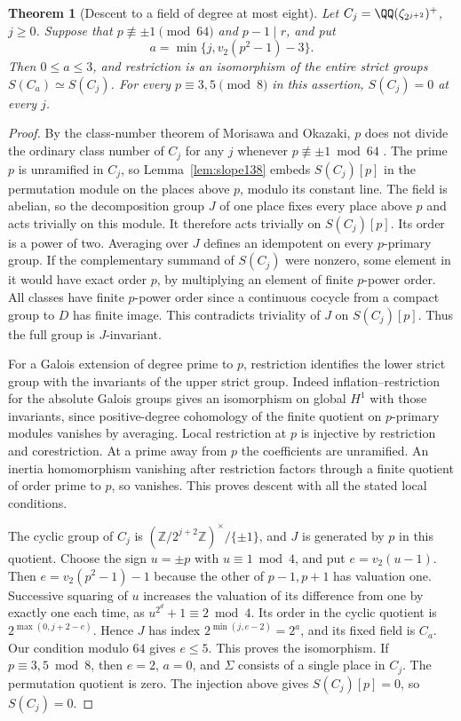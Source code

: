 \documentclass[a4paper,11pt]{article}
\newtheorem{theorem}[proposition]{Theorem}
\theoremstyle{definition}
\theoremstyle{remark}
\newcommand{\ZZ}{\mathbb Z}\newcommand{\ord}{\operatorname{ord}}
\numberwithin{equation}{section}
\begin{document}
\begin{theorem}[Descent to a field of degree at most eight]
\label{thm:tower138}
Let \(C_j=\QQ(\zeta_{2^{j+2}})^+\), \(j\ge0\). Suppose that
\(p\not\equiv\pm1\pmod{64}\) and \(p-1\mid r\), and put
\[
        a=\min\{j,v_2(p^2-1)-3\}.
\]
Then \(0\le a\le3\), and restriction is an isomorphism of the
entire strict groups \(S(C_a)\simeq S(C_j)\).
For every \(p\equiv3,5\pmod8\) in this assertion,
\(S(C_j)=0\) at every \(j\).
\end{theorem}
\begin{proof}
By the class-number theorem of Morisawa and Okazaki, \(p\) does
not divide the ordinary class number of \(C_j\) for any \(j\)
whenever \(p\not\equiv\pm1\bmod64\)
\cite[Corollary B]{V-III-V-mo138}. The prime \(p\) is unramified in
\(C_j\), so Lemma~\ref{lem:slope138} embeds \(S(C_j)[p]\) in
the permutation module on the places above \(p\), modulo its
constant line. The field is abelian, so the decomposition group
\(J\) of one place fixes every place above \(p\) and acts
trivially on this module. It therefore acts trivially on
\(S(C_j)[p]\). Its order is a power of two. Averaging over \(J\)
defines an idempotent on every \(p\)-primary group.
If the complementary summand of \(S(C_j)\) were nonzero, some
element in it would have exact order \(p\), by multiplying an
element of finite \(p\)-power order. All classes have finite
\(p\)-power order since a continuous cocycle from a compact
group to \(D\) has finite image. This contradicts triviality
of \(J\) on \(S(C_j)[p]\). Thus the full group is \(J\)-invariant.

For a Galois extension of degree prime to \(p\), restriction
identifies the lower strict group with the invariants of
the upper strict group. Indeed inflation--restriction for
the absolute Galois groups gives an isomorphism on global
\(H^1\) with those invariants, since positive-degree cohomology
of the finite quotient on \(p\)-primary modules vanishes by
averaging. Local restriction at \(p\) is injective by
restriction and corestriction. At a prime away from \(p\) the
coefficients are unramified. An inertia homomorphism vanishing
after restriction factors through a finite quotient of order
prime to \(p\), so vanishes. This proves descent with all the
stated local conditions.

The cyclic group of \(C_j\) is
\((\ZZ/2^{j+2}\ZZ)^\times/\{\pm1\}\), and \(J\) is generated
by \(p\) in this quotient. Choose the sign \(u=\pm p\) with
\(u\equiv1\bmod4\), and put \(e=v_2(u-1)\).
Then \(e=v_2(p^2-1)-1\) because the other of \(p-1,p+1\)
has valuation one. Successive squaring of \(u\) increases
the valuation of its difference from one by exactly one each
time, as \(u^{2^d}+1\equiv2\bmod4\). Its order in the cyclic
quotient is \(2^{\max(0,j+2-e)}\). Hence \(J\) has index
\(2^{\min(j,e-2)}=2^a\), and its fixed field is \(C_a\).
Our condition modulo \(64\) gives \(e\le5\).
This proves the isomorphism. If \(p\equiv3,5\bmod8\), then
\(e=2\), \(a=0\), and \(\Sigma\) consists of a single place
in \(C_j\). The permutation quotient is zero. The injection
above gives \(S(C_j)[p]=0\), so \(S(C_j)=0\).
\end{proof}
\end{document}
